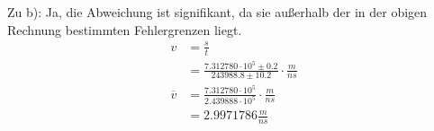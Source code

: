 \documentclass[12pt,a4paper,notitlepage]{article}
\numberwithin{equation}{section}
\begin{document}
Zu b): Ja, die Abweichung ist signifikant, da sie außerhalb der in der obigen Rechnung bestimmten Fehlergrenzen liegt.
\begin{align}
v&=\frac{s}{t}\\
&=\frac{7.312780\cdot10^5\pm0.2}{243988.8\pm10.2}\cdot\frac{m}{ns}\\
\overline v&=\frac{7.312780\cdot10^5}{2.439888\cdot10^5}\cdot\frac{m}{ns}\\
&=2.9971786 \frac{m}{ns}
\end{align}
\end{document}
